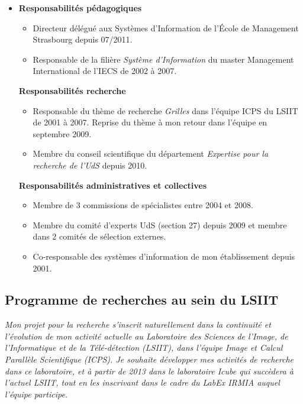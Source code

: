 \documentclass[11pt]{article}
\begin{document}
\begin{itemize}
\item
 	\textbf{Responsabilités pédagogiques}
	\begin{itemize}
		\item Directeur délégué aux Systèmes d'Information de 
		      l'\'Ecole de Management Strasbourg depuis 07/2011.
		\item Responsable de la filière \textit{Système d'Information} 
		      du master Management International de l'IECS de 2002 à 2007.
	\end{itemize}
 	\textbf{Responsabilités recherche}
	\begin{itemize}
		\item Responsable du thème de recherche \textit{Grilles} dans 
		      l'équipe ICPS du LSIIT de 2001 à 2007. 
			Reprise du thème à mon retour dans l'équipe en septembre 2009.
		\item Membre du conseil scientifique du département \emph{Expertise 
		      pour la recherche de l'UdS} depuis 2010.
	\end{itemize}
 	\textbf{Responsabilités administratives et collectives}
	\begin{itemize}
		\item Membre de 3 commissions de spécialistes entre 2004 et 2008.
		\item Membre du comité d'experts UdS (section 27) depuis 2009 et 
		      membre dans 2 comités de sélection externes.
	      \item Co-responsable des systèmes d'information de mon 
		      établissement depuis 2001.
	\end{itemize}
\end{itemize}




\newpage


\subsection{Programme de recherches au sein du LSIIT}

\textit{%
Mon projet pour la recherche s'inscrit naturellement dans la continuité et 
l'évolution de mon activité actuelle au Laboratoire des Sciences de l'Image,
de l'Informatique et de la Télé-détection (LSIIT), dans l'équipe Image et
Calcul Parallèle Scientifique (ICPS). Je souhaite développer mes activités 
de recherche dans ce laboratoire, et à partir de  2013 dans le laboratoire 
Icube qui succèdera à l'actuel LSIIT, tout en les inscrivant dans le cadre
du LabEx IRMIA auquel l'équipe participe.}\\
\end{document}
